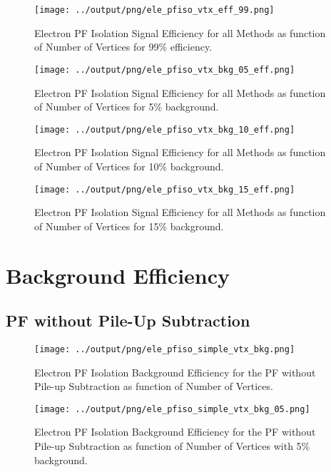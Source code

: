 \documentclass[11pt]{book}
\begin{document}
\begin{figure}[htb]
\centering
\texttt{[image: ../output/png/ele\_pfiso\_vtx\_eff\_99.png]}
\caption{Electron PF Isolation Signal Efficiency for all Methods as function of Number of Vertices for 99\% efficiency.}
\label{fig:ele_pfiso_vtx_eff_99}
\end{figure}

\begin{figure}[htb]
\centering
\texttt{[image: ../output/png/ele\_pfiso\_vtx\_bkg\_05\_eff.png]}
\caption{Electron PF Isolation Signal Efficiency for all Methods as function of Number of Vertices for 5\% background.}
\label{fig:ele_pfiso_vtx_bkg_05_eff}
\end{figure}

\begin{figure}[htb]
\centering
\texttt{[image: ../output/png/ele\_pfiso\_vtx\_bkg\_10\_eff.png]}
\caption{Electron PF Isolation Signal Efficiency for all Methods as function of Number of Vertices for 10\% background.}
\label{fig:ele_pfiso_vtx_bkg_10_eff}
\end{figure}

\begin{figure}[htb]
\centering
\texttt{[image: ../output/png/ele\_pfiso\_vtx\_bkg\_15\_eff.png]}
\caption{Electron PF Isolation Signal Efficiency for all Methods as function of Number of Vertices for 15\% background.}
\label{fig:ele_pfiso_vtx_bkg_15_eff}
\end{figure}
\clearpage

\section{Background Efficiency}
\subsection{PF without Pile-Up Subtraction}
\begin{figure}[htb]
\centering
\texttt{[image: ../output/png/ele\_pfiso\_simple\_vtx\_bkg.png]}
\caption{Electron PF Isolation Background Efficiency for the PF without Pile-up Subtraction as function of Number of Vertices.}
\label{fig:ele_pfiso_vtx_bkg_simple}
\end{figure}

\begin{figure}[htb]
\centering
\texttt{[image: ../output/png/ele\_pfiso\_simple\_vtx\_bkg\_05.png]}
\caption{Electron PF Isolation Background Efficiency for the PF without Pile-up Subtraction as function of Number of Vertices with 5\% background.}
\label{fig:ele_pfiso_vtx_bkg_simple_bkg_05}
\end{figure}
\end{document}
